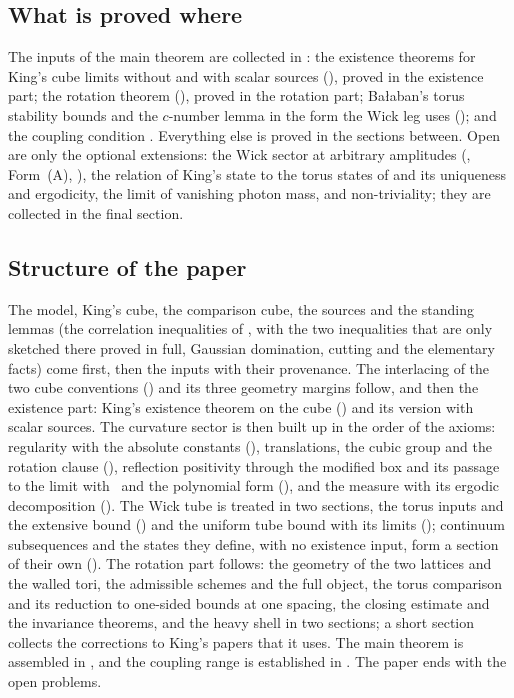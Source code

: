 \subsection{What is proved where}

The inputs of the main theorem are collected in : the existence theorems for King's cube
limits without and with scalar sources (), proved in the existence part; the
rotation theorem (), proved in the rotation part; Ba{\l}aban's torus stability bounds and
the $c$-number lemma in the form the Wick leg uses (); and the coupling
condition \Tthree. Everything else is proved in the sections between. Open are only the optional
extensions: the Wick sector at arbitrary amplitudes (\Wtwo, Form~(A), ), the relation
of King's state to the torus states of \cite{SymPhase} and its uniqueness and ergodicity, the limit of
vanishing photon mass, and non-triviality; they are collected in the final section.

\subsection{Structure of the paper}

The model, King's cube, the comparison cube, the sources and the standing lemmas (the correlation
inequalities of \cite{BFS1}, with the two inequalities that are only sketched there proved in full, Gaussian
domination, cutting and the elementary facts) come first, then the inputs with their provenance. The
interlacing of the two cube conventions () and its three geometry margins
follow, and then the existence part: King's existence theorem on the cube () and its version
with scalar sources. The curvature sector is then built up in the order of the axioms: regularity with the
absolute constants (), translations, the cubic group and the rotation clause
(), reflection positivity through the modified box and its passage to the
limit with \OSth\ and the polynomial form (),
and the measure with its ergodic decomposition (). The Wick tube is treated in two
sections, the torus inputs and the extensive bound () and the uniform tube
bound with its limits (); continuum subsequences and the states they
define, with no existence input, form a section of their own (). The rotation part
follows: the geometry of the two lattices and the walled tori, the admissible schemes and the full object,
the torus comparison and its reduction to one-sided bounds at one spacing, the closing estimate and the
invariance theorems, and the heavy shell in two sections; a short section collects the corrections to
King's papers that it uses. The main theorem is assembled in , and the coupling range
is established in . The paper ends with the open problems.
